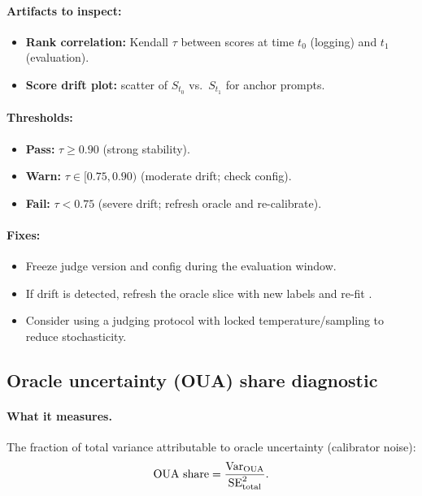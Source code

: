 \paragraph{Artifacts to inspect:}
\begin{itemize}
\item \textbf{Rank correlation:} Kendall $\tau$ between scores at time $t_0$ (logging) and $t_1$ (evaluation).
\item \textbf{Score drift plot:} scatter of $S_{t_0}$ vs.\ $S_{t_1}$ for anchor prompts.
\end{itemize}

\paragraph{Thresholds:}
\begin{itemize}
\item \textbf{Pass:} $\tau \ge 0.90$ (strong stability).
\item \textbf{Warn:} $\tau \in [0.75, 0.90)$ (moderate drift; check config).
\item \textbf{Fail:} $\tau < 0.75$ (severe drift; refresh oracle and re-calibrate).
\end{itemize}

\paragraph{Fixes:}
\begin{itemize}
\item Freeze judge version and config during the evaluation window.
\item If drift is detected, refresh the oracle slice with new labels and re-fit \autocal.
\item Consider using a judging protocol with locked temperature/sampling to reduce stochasticity.
\end{itemize}

\subsection{Oracle uncertainty (OUA) share diagnostic}

\paragraph{What it measures.} The fraction of total variance attributable to oracle uncertainty (calibrator noise):
\begin{equation}
\text{OUA share} = \frac{\operatorname{Var}_{\text{OUA}}}{\operatorname{SE}^2_{\text{total}}}.
\end{equation}

